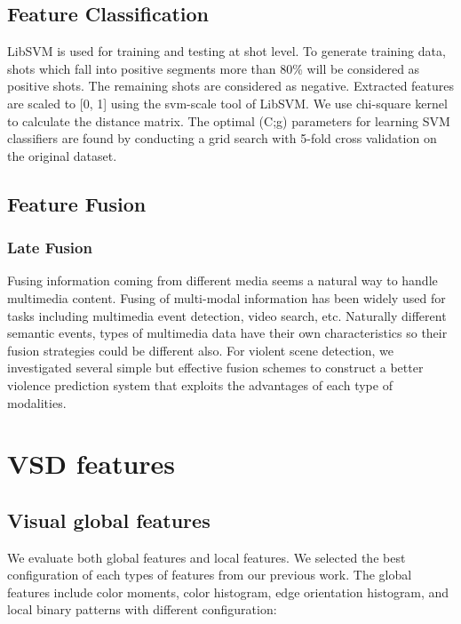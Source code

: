 \documentclass[review]{elsarticle}
\begin{document}
\subsection{Feature Classification}

LibSVM \cite{LibSVM} is used for training and testing at shot level. To generate training data, shots which fall into positive segments more than 80\% will be considered as positive shots. The remaining shots are considered as negative. Extracted features are scaled to [0, 1] using the svm-scale tool of LibSVM. We use chi-square kernel to calculate the distance matrix. The optimal (C;g) parameters for learning SVM classifiers are found by conducting a grid search with 5-fold cross validation on the original dataset.

\subsection{Feature Fusion}
\subsubsection{Late Fusion}
Fusing information coming from different media seems a natural way to handle multimedia content. Fusing of multi-modal information has been widely used for tasks including multimedia event detection, video search, etc. Naturally different semantic events, types of multimedia data have their own characteristics so their fusion strategies could be different also. For violent scene detection, we investigated several simple but effective fusion schemes to construct a better violence prediction system that exploits the advantages of each type of modalities. 

\section{VSD features}
\label{vsd_feature}

\subsection{Visual global features}

We evaluate both global features and local features. We selected the best configuration of each types of features from our previous work\cite{lam2012nii}. The global features include color moments, color histogram, edge orientation histogram, and local binary patterns with different configuration:
\end{document}
